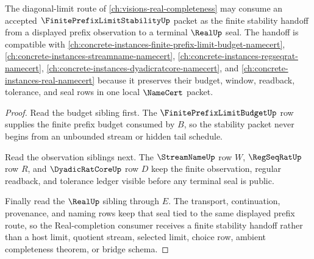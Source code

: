 \begin{theorem}
\label{thm:finite-prefix-limit-stability-real-handoff}
The diagonal-limit route of \autoref{ch:visions-real-completeness} may consume an accepted $\FinitePrefixLimitStabilityUp$ packet as the finite stability handoff from a displayed prefix observation to a terminal $\RealUp$ seal. The handoff is compatible with \autoref{ch:concrete-instances-finite-prefix-limit-budget-namecert}, \autoref{ch:concrete-instances-streamname-namecert}, \autoref{ch:concrete-instances-regseqrat-namecert}, \autoref{ch:concrete-instances-dyadicratcore-namecert}, and \autoref{ch:concrete-instances-real-namecert} because it preserves their budget, window, readback, tolerance, and seal rows in one local $\NameCert$ packet.
\end{theorem}
\begin{proof}
Read the budget sibling first. The $\FinitePrefixLimitBudgetUp$ row supplies the finite prefix budget consumed by $B$, so the stability packet never begins from an unbounded stream or hidden tail schedule.

Read the observation siblings next. The $\StreamNameUp$ row $W$, $\RegSeqRatUp$ row $R$, and $\DyadicRatCoreUp$ row $D$ keep the finite observation, regular readback, and tolerance ledger visible before any terminal seal is public.

Finally read the $\RealUp$ sibling through $E$. The transport, continuation, provenance, and naming rows keep that seal tied to the same displayed prefix route, so the Real-completion consumer receives a finite stability handoff rather than a host limit, quotient stream, selected limit, choice row, ambient completeness theorem, or bridge schema.
\end{proof}

